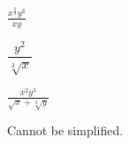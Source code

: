 \begin{exercise}
$\displaystyle \frac{x^{\frac{2}{3}}y^3}{xy}$
\end{exercise}

\begin{solution}
$\dfrac{y^2}{\sqrt[3]{x}}$
\end{solution}

\begin{exercise}\label{exercise-4.2.14}
$\displaystyle \frac{x^2y^3}{\sqrt{x}+\sqrt[3]{y}}$
\end{exercise}

\begin{solution}
Cannot be simplified.
\end{solution}